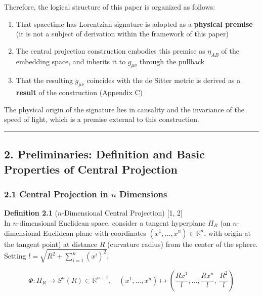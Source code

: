 \documentclass[a4paper,11pt]{article}
\theoremstyle{definition}
\providecommand{\tightlist}{\setlength{\itemsep}{0pt}\setlength{\parskip}{0pt}}
\begin{document}
Therefore, the logical structure of this paper is organized as follows:

\begin{enumerate}
\def\labelenumi{\arabic{enumi}.}
\tightlist
\item
  That spacetime has Lorentzian signature is adopted as a \textbf{physical premise} (it is not a subject of derivation within the framework of this paper)
\item
  The central projection construction embodies this premise as \(\eta_{AB}\) of the embedding space, and inherits it to \(g_{\mu\nu}\) through the pullback
\item
  That the resulting \(g_{\mu\nu}\) coincides with the de Sitter metric is derived as a \textbf{result} of the construction (Appendix C)
\end{enumerate}

The physical origin of the signature lies in causality and the invariance of the speed of light, which is a premise external to this construction.

\begin{center}\rule{0.5\linewidth}{0.5pt}\end{center}

\subsection{2. Preliminaries: Definition and Basic Properties of Central Projection}\label{preliminaries-definition-and-basic-properties-of-central-projection}

\subsubsection{\texorpdfstring{2.1 Central Projection in \(n\) Dimensions}{2.1 Central Projection in n Dimensions}}\label{central-projection-in-n-dimensions}

\textbf{Definition 2.1} (\(n\)-Dimensional Central Projection) {[}1, 2{]}\\
In \(n\)-dimensional Euclidean space, consider a tangent hyperplane \(\Pi_R\) (an \(n\)-dimensional Euclidean plane with coordinates \((x^1, \ldots, x^n) \in \mathbb{R}^n\), with origin at the tangent point) at distance \(R\) (curvature radius) from the center of the sphere. Setting \(l = \sqrt{R^2 + \sum_{i=1}^n (x^i)^2}\),

\[\Phi: \Pi_R \to S^n(R) \subset \mathbb{R}^{n+1}, \quad (x^1, \ldots, x^n) \mapsto \left(\frac{R x^1}{l}, \ldots, \frac{R x^n}{l},\ \frac{R^2}{l}\right) \tag{2.1}\]
\end{document}
